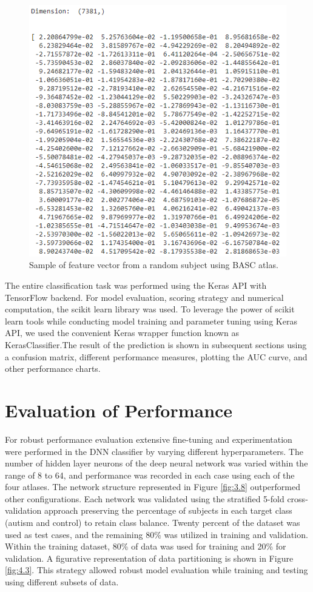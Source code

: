 \begin{figure}[h]
\centering
\includegraphics[width=\linewidth]{figures/Figure 4.2.png}
\caption{Sample of feature vector from a random subject using BASC atlas.}
\label{fig:4.2}
\end{figure}

The entire classification task was performed using the Keras API with TensorFlow backend.
For model evaluation, scoring strategy and numerical computation, the scikit learn library
was used. To leverage the power of scikit learn tools while conducting model training and
parameter tuning using Keras API, we used the convenient Keras wrapper function known as
KerasClassifier.The result of the prediction is shown in subsequent sections using a confusion matrix,
different performance measures, plotting the AUC curve, and other performance charts.\\


\section{Evaluation of Performance}
For robust performance evaluation extensive fine-tuning and experimentation were performed in the DNN classifier by varying different hyperparameters. The number of hidden layer neurons of the deep neural network was varied within the range of 8 to 64, and performance was recorded in each case using each of the four atlases. The network structure represented in Figure \ref{fig:3.8}  outperformed other configurations. Each network was validated using the stratified 5-fold cross-validation approach preserving the percentage of subjects in each target class (autism and control) to retain class balance. Twenty percent of the dataset was used as test cases, and the remaining 80\% was utilized in training and validation. Within the training dataset, 80\% of data was used for training and 20\% for validation. A figurative representation of data partitioning is shown in Figure \ref{fig:4.3}. This strategy allowed robust model evaluation while training and testing using different subsets of data.

